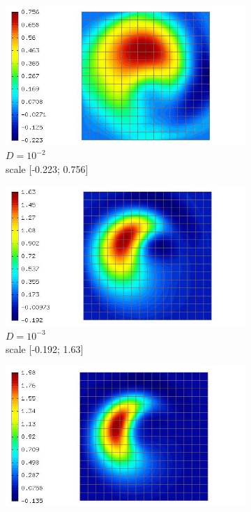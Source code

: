 \documentclass[mathserif]{beamer}
\begin{document}
\begin{frame}
\begin{figure}[H]
\begin{subfigure}[H]{0.02\textwidth}
	\end{subfigure}
	\begin{subfigure}[H]{0.3\textwidth}
		\centering
		\includegraphics[width=.9\textwidth, trim = 65mm 0mm 0mm 0mm, clip]{images/timedep-multiscale/convergence/256_eps=001_50.jpg}
		\vspace{-3mm}
		\caption{$D = 10^{-2}$\\\vspace{-2mm}scale [-0.223; 0.756]}
	\end{subfigure}
	\begin{subfigure}[H]{0.3\textwidth}
		\centering
		\includegraphics[width=.9\textwidth, trim = 65mm 0mm 0mm 0mm, clip]{images/timedep-multiscale/convergence/256_eps=0001_50.jpg}
		\vspace{-3mm}
		\caption{$D = 10^{-3}$\\\vspace{-2mm}scale [-0.192; 1.63]}
	\end{subfigure}
	\begin{subfigure}[H]{0.3\textwidth}
		\centering
		\includegraphics[width=.9\textwidth, trim = 65mm 0mm 0mm 0mm, clip]{images/timedep-multiscale/convergence/256_eps=0_50.jpg}

\end{subfigure}
\end{figure}
\end{frame}
\end{document}
